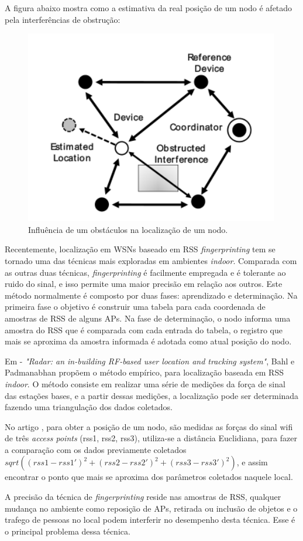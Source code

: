 A figura abaixo mostra como a estimativa da real posição de um nodo é afetado pela interferências de obstrução:
	\begin{figure}[ht]
	\centering
	\includegraphics[scale=0.5]{images/rsserror.png}
	\caption{Influência de um obstáculos na localização de um nodo\cite{rss1}. }
	\label{fig:rsserror}
	\end{figure}
	
	Recentemente, localização em WSNs baseado em RSS \textit{fingerprinting} tem se tornado uma das técnicas mais exploradas 
	em ambientes \textit{indoor}\cite{fingerPrint}\cite{wifiRadar}\cite{fingerPrint2}. Comparada com as outras duas técnicas, \textit{fingerprinting} é facilmente empregada 
	e é tolerante ao ruido do sinal, e isso permite uma maior precisão em relação aos outros. Este método normalmente é composto por duas fases: 
	aprendizado e determinação. Na primeira fase o objetivo é construir uma tabela para cada coordenada de amostras de RSS 
	de alguns APs. Na fase de determinação, o nodo informa uma amostra do RSS que é comparada com cada entrada do tabela, o registro
	que mais se aproxima da amostra informada é adotada como atual posição do nodo.
	
   Em \cite{wifiRadar} - \textit{"Radar: an in-building RF-based user location and tracking system"}, Bahl e Padmanabhan propõem o método empírico,
   para localização baseada em RSS \textit{indoor}. O método consiste em realizar uma série de medições da força de sinal das estações bases, 
   e a partir dessas medições, a localização pode ser determinada fazendo uma triangulação dos dados coletados. 

  No artigo \cite{wifiRadar}, para obter a posição de um nodo, são medidas as forças do sinal wifi de três \textit{access points} (rss1, rss2, rss3), 
utiliza-se a distância Euclidiana, para fazer a comparação com os dados previamente coletados $sqrt((rss1-rss1')^{2}+(rss2-rss2')^{2}+(rss3-rss3')^{2})$, 
e assim encontrar o ponto que mais se aproxima dos parâmetros coletados naquele local. 
	
	A precisão da técnica de \textit{fingerprinting} reside nas amostras de RSS, qualquer mudança no ambiente como 
	reposição de APs, retirada ou inclusão de objetos e o trafego de pessoas no local podem interferir no desempenho desta técnica. 
	Esse é o principal problema dessa técnica.


